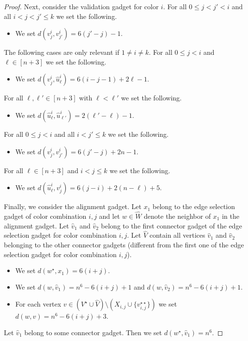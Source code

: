 \documentclass[11pt,a4paper]{article}
\theoremstyle{remark}
\theoremstyle{definition}
\begin{document}
\begin{proof}
Next, consider the validation gadget for color $i$. 
%
For all $0\le j<j'<i$ and all $i<j<j'\le k$ we set the following.
\begin{itemize}
    \item We set $d(v^i_j,v^i_{j'})=6(j'-j)-1$.
\end{itemize}

The following cases are only relevant if $1\neq i \neq k$. 
For all $0\le j<i$ and $\ell\in[n+3]$ we set the following.
\begin{itemize}
    \item We set $d(v^i_j,\hat{u}^i_{\ell})=6(i-j-1)+2\ell-1$.
\end{itemize}
For all $\ell,\ell'\in[n+3]$ with $\ell<\ell'$ we set the following.
\begin{itemize}
    \item We set $d(\hat{u}^i_{\ell},\hat{u}^i_{\ell'})=2(\ell'-\ell)-1$.
\end{itemize}
For all $0\le j<i$ and all $i<j'\le k$ we set the following.
\begin{itemize}
    \item We set $d(v^i_j,v^i_{j'})=6(j'-j)+2n-1$.
\end{itemize}
For all $\ell\in[n+3]$ and $i<j\le k$ we set the following.
\begin{itemize}
    \item We set $d(\hat{u}^i_{\ell},v^i_j)=6(j-i)+2(n-\ell)+5$.
\end{itemize}

Finally, we consider the alignment gadget. Let $x_1$ belong to the edge selection gadget of color combination $i,j$ and let $w\in \hat{W}$ denote the neighbor of $x_1$ in the alignment gadget. Let $\hat{v}_1$ and $\hat{v}_2$ belong to the first connector gadget of the edge selection gadget for color combination $i,j$. Let $\hat{V}$ contain all vertices $\hat{v}_1$ and $\hat{v}_2$ belonging to the other connector gadgets (different from the first one of the edge selection gadget for color combination $i,j$). 
\begin{itemize}
    \item We set $d(w^\star,x_1)=6(i+j)$.
    \item We set $d(w,\hat{v}_1)=n^6-6(i+j)+1$ and $d(w,\hat{v}_2)=n^6-6(i+j)+1$.
    \item For each vertex $v\in (V^\star\cup \hat{V})\setminus (X_{i,j}\cup \{v_{i,j}^{\star\star}\})$ we set $d(w,v)=n^6-6(i+j)+3$.
\end{itemize}
Let $\hat{v}_1$ belong to some connector gadget. Then we set $d(w^\star,\hat{v}_1)=n^6$.


\end{proof}
\end{document}

